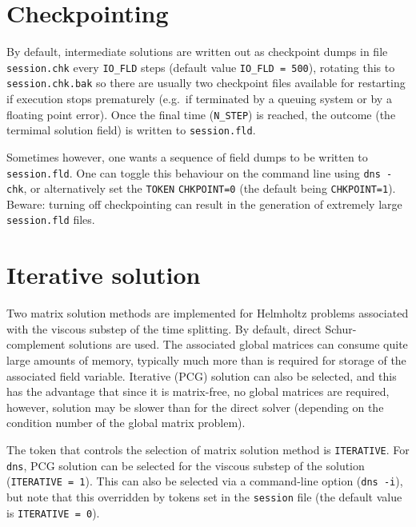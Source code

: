 \documentclass[11pt]{report}
\newcommand{\eg}{e.g.\ } \newcommand{\CC}{\mathrm{c.c.}}
\begin{document}
\section{Checkpointing}
\label{sec.check}

By default, intermediate solutions are written out as checkpoint dumps
in file \verb+session.chk+ every \verb+IO_FLD+ steps (default value
\verb+IO_FLD = 500+), rotating this to \verb+session.chk.bak+ so there
are usually two checkpoint files available for restarting if execution
stops prematurely (\eg if terminated by a queuing system or by a
floating point error).  Once the final time (\verb+N_STEP+) is
reached, the outcome (the termimal solution field) is written to
\verb+session.fld+.

Sometimes however, one wants a sequence of field dumps to be written
to \verb+session.fld+.  One can toggle this behaviour on the command
line using \verb+dns -chk+, or alternatively set the \verb+TOKEN+
\verb+CHKPOINT=0+ (the default being \verb+CHKPOINT=1+).  Beware:
turning off checkpointing can result in the generation of extremely
large \verb+session.fld+ files.

\section{Iterative solution}
\label{sec.iterative}

Two matrix solution methods are implemented for Helmholtz problems
associated with the viscous substep of the time splitting.  By
default, direct Schur-complement solutions are used.  The associated
global matrices can consume quite large amounts of memory, typically
much more than is required for storage of the associated field
variable.  Iterative (PCG) solution can also be selected, and this has
the advantage that since it is matrix-free, no global matrices are
required, however, solution may be slower than for the direct solver
(depending on the condition number of the global matrix problem).

The token that controls the selection of matrix solution method is
\verb+ITERATIVE+.  For \verb+dns+, PCG solution can be selected for
the viscous substep of the solution (\verb+ITERATIVE = 1+).  This can
also be selected via a command-line option (\verb+dns -i+), but note
that this overridden by tokens set in the \verb+session+ file (the
default value is \verb+ITERATIVE = 0+).
\end{document}
